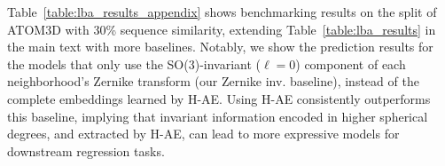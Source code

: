 Table~\ref{table:lba_results_appendix} shows benchmarking results on the split of ATOM3D with 30\%
sequence similarity, extending Table~\ref{table:lba_results} in the main text with more baselines.
Notably, we show the prediction results for the models that only use the SO(3)-invariant ($\ell =
0$) component of each neighborhood's Zernike transform (our Zernike inv. baseline), instead of the
complete embeddings learned by H-AE. Using H-AE consistently outperforms this baseline, implying
that invariant information encoded in higher spherical degrees, and extracted by H-AE, can lead to
more expressive models for downstream regression tasks.

